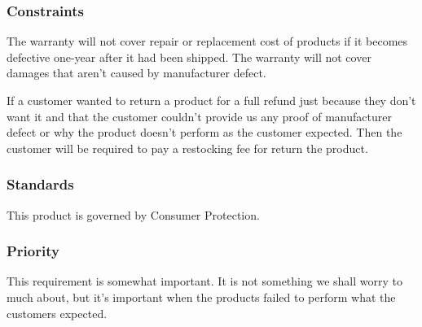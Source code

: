 \subsubsection{Constraints}
The warranty will not cover repair or replacement cost of products if it becomes defective one-year after it had been shipped. The warranty will not cover damages that aren't caused by manufacturer defect.

If a customer wanted to return a product for a full refund just because they don't want it and that the customer couldn't provide us any proof of manufacturer defect or why the product doesn't perform as the customer expected. Then the customer will be required to pay a restocking fee for return the product.
\subsubsection{Standards}
This product is governed by Consumer Protection.
\subsubsection{Priority}
This requirement is somewhat important. It is not something we shall worry to much about, but it's important when the products failed to perform what the customers expected.